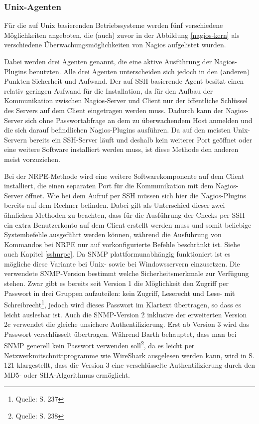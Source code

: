 \subsubsection{Unix-Agenten}
Für die auf Unix basierenden Betriebssysteme werden fünf verschiedene Möglichkeiten angeboten, die (auch) zuvor in der Abbildung \ref{nagios-kern} als verschiedene Überwachungsmöglichkeiten von Nagios aufgelistet wurden.



Dabei werden drei Agenten genannt, die eine aktive Ausführung der Nagios-Plugins benutzten.
Alle drei Agenten unterscheiden sich jedoch in den (anderen) Punkten Sicherheit und Aufwand.
Der auf \gls{SSH} basierende Agent besitzt einen relativ geringen Aufwand für die Installation, da für den Aufbau der Kommunikation zwischen Nagios-Server und Client nur der öffentliche Schlüssel des Servers auf dem Client eingetragen werden muss.
Dadurch kann der Nagios-Server sich ohne Passwortabfrage an dem zu überwachendem Host anmelden und die sich darauf befindlichen Nagios-Plugins ausführen.
Da auf den meisten Unix-Servern bereits ein \gls{SSH}-Server läuft und deshalb kein weiterer Port geöffnet oder eine weitere Software installiert werden muss, ist diese Methode den anderen meist vorzuziehen.

Bei der \gls{NRPE}-Methode wird eine weitere Softwarekomponente auf dem Client installiert, die einen separaten Port für die Kommunikation mit dem Nagios-Server öffnet.
Wie bei dem Aufruf per \gls{SSH} müssen sich hier die Nagios-Plugins bereits auf dem Rechner befinden.
Dabei gilt als Unterschied dieser zwei ähnlichen Methoden zu beachten, dass für die Ausführung der Checks per \gls{SSH} ein extra Benutzerkonto auf dem Client erstellt werden muss und somit beliebige Systembefehle ausgeführt werden können, während die Ausführung von Kommandos bei \gls{NRPE} nur auf vorkonfigurierte Befehle beschränkt ist.
Siehe auch Kapitel \ref{sshnrpe}.
\label{unixagents}
Da \gls{SNMP} plattformunabhängig funktioniert ist es mögliche diese Variante bei Unix- sowie bei Windowsservern einzusetzen.
Die verwendete \gls{SNMP}-Version bestimmt welche Sicherheitsmerkmale zur Verfügung stehen.
Zwar gibt es bereits seit Version 1 die Möglichkeit den Zugriff per Passwort in drei Gruppen aufzuteilen: kein Zugriff, Leserecht und Lese- mit Schreibrecht\footnote{Quelle: \cite{Barth08} S. 237}, jedoch wird dieses Passwort im Klartext übertragen, so dass es leicht auslesbar ist.
Auch die \gls{SNMP}-Version 2 inklusive der erweiterten Version 2c verwendet die gleiche unsichere Authentifizierung.
Erst ab Version 3 wird das Passwort verschlüsselt übertragen.
Während Barth behauptet, dass man bei \gls{SNMP} generell kein Passwort verwenden soll\footnote{Quelle: \cite{Barth08} S. 238}, da es leicht per Netzwerkmitschnittprogramme wie WireShark ausgelesen werden kann, wird in \cite{Jose07} S. 121 klargestellt, dass die Version 3 eine verschlüsselte Authentifizierung durch den MD5- oder SHA-Algorithmus ermöglicht.

